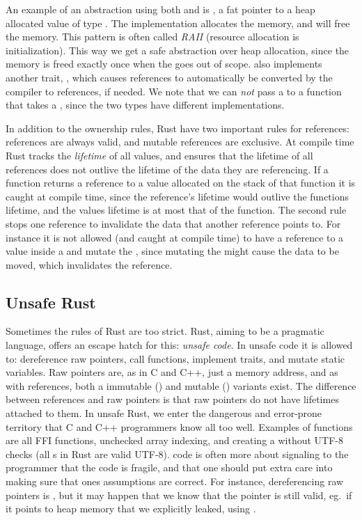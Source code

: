 \documentclass[b5paper]{report}
\begin{document}
An example of an abstraction using both  and  is
, a fat pointer to a heap allocated value of type
. The  implementation allocates the memory, and 
will free the memory. This pattern is often called \emph{RAII} (resource
allocation is initialization). This way we get a safe abstraction over heap
allocation, since the memory is freed exactly once when the  goes out
of scope.   also implements another trait, , which
causes  references to automatically be converted by the compiler to
 references, if needed. We note that we can \emph{not} pass a
 to a function that takes a , since the two types have
different  implementations.

In addition to the ownership rules, Rust have two important rules for
references: references are always valid, and mutable references are exclusive.
At compile time Rust tracks the \emph{lifetime} of all values, and ensures that
the lifetime of all references does not outlive the lifetime of the data they
are referencing. If a function returns a reference to a value allocated on the
stack of that function it is caught at compile time, since the reference's
lifetime would outlive the functions lifetime, and the values lifetime is at
most that of the function. The second rule stops one reference to invalidate the
data that another reference points to. For instance it is not allowed (and
caught at compile time) to have a reference to a value inside a  and
mutate the , since mutating the  might cause the data to be
moved, which invalidates the reference.

\subsection{Unsafe Rust}

Sometimes the rules of Rust are too strict. Rust, aiming to be a pragmatic
language, offers an escape hatch for this: \emph{unsafe code}. In unsafe code it
is allowed to: dereference raw pointers, call  functions, implement
 traits, and mutate static variables. Raw pointers are, as in C and
C++, just a memory address, and as with references, both a immutable
() and mutable () variants exist. The difference
between references and raw pointers is that raw pointers do not have lifetimes
attached to them. In unsafe Rust, we enter the dangerous and error-prone
territory that C and C++ programmers know all too well. Examples of
 functions are all FFI functions, unchecked array indexing, and
creating a  without UTF-8 checks (all s in Rust are
valid UTF-8).  code is often more about signaling to the programmer
that the code is fragile, and that one should put extra care into making sure
that ones assumptions are correct. For instance, dereferencing raw pointers is
, but it may happen that we know that the pointer is still valid,
eg.\ if it points to heap memory that we explicitly leaked, using
.
\end{document}
